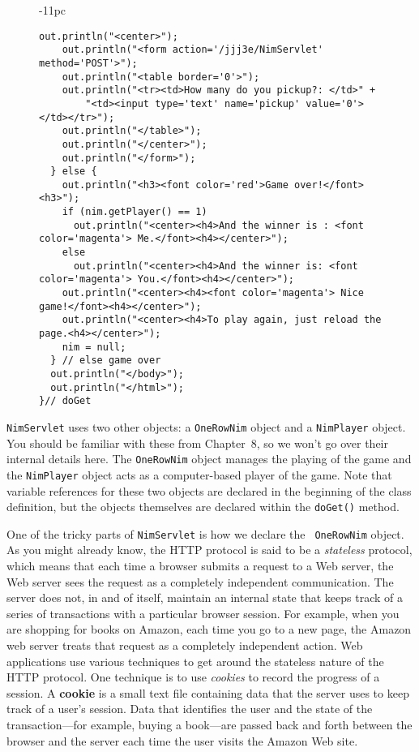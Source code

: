 \begin{figure}[p]
\begin{jjjlistingleft}[37pc]{-11pc}
\begin{lstlisting}[basicstyle=\scriptsize]
    out.println("<center>");
    out.println("<form action='/jjj3e/NimServlet' method='POST'>");
    out.println("<table border='0'>");
    out.println("<tr><td>How many do you pickup?: </td>" +
        "<td><input type='text' name='pickup' value='0'></td></tr>");
    out.println("</table>");
    out.println("</center>");
    out.println("</form>");
  } else {
    out.println("<h3><font color='red'>Game over!</font><h3>");
    if (nim.getPlayer() == 1)
      out.println("<center><h4>And the winner is : <font color='magenta'> Me.</font><h4></center>");
    else
      out.println("<center><h4>And the winner is: <font color='magenta'> You.</font><h4></center>");
    out.println("<center><h4><font color='magenta'> Nice game!</font><h4></center>");
    out.println("<center><h4>To play again, just reload the page.<h4></center>");
    nim = null;
  } // else game over
  out.println("</body>");
  out.println("</html>");
}// doGet
\end{lstlisting}
\end{jjjlistingleft}
\end{figure}

{\tt NimServlet} uses two other objects: a {\tt OneRowNim} object and
a {\tt NimPlayer} object.  You should be familiar with these from
Chapter~8, so we won't go over their internal details here. The
{\tt OneRowNim} object manages the playing of the game and the
{\tt NimPlayer} object acts as a computer-based player of the game.
Note that variable references for these two objects are declared in
the beginning of the class definition, but the objects themselves
are declared within the {\tt doGet()} method.

One of the tricky parts of {\tt NimServlet} is how we declare the {\tt
OneRowNim} object.  As you might already know, the HTTP protocol is said to be a
{\em stateless} protocol, which means that each time a browser submits
a request to a Web server, the Web server sees the request as a
completely independent communication. The server does not, in and of
itself, maintain an internal state that keeps track of a series of
transactions with a particular browser session.  For example, when you
are shopping for books on Amazon, each time you go to a new page, the
Amazon web server treats that request as a completely independent
action.  Web applications use various techniques to get around the
stateless nature of the HTTP protocol. One technique is to use {\em
cookies} to record the progress of a session. A {\bf cookie} is a
small text file containing data that the server uses to keep track of
a user's session. Data that identifies the user and the state of the
transaction---for example, buying a book---are passed back and forth
between the browser and the server each time the user visits the
Amazon Web site.

